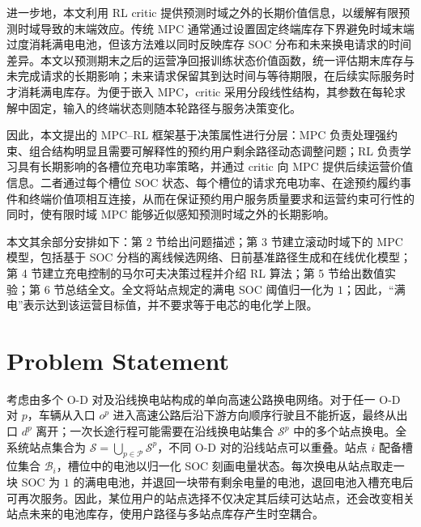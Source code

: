 \documentclass[12pt,a4paper,UTF8]{ctexart}
\begin{document}
进一步地，本文利用 RL critic 提供预测时域之外的长期价值信息，以缓解有限预测时域导致的末端效应。传统 MPC 通常通过设置固定终端库存下界避免时域末端过度消耗满电电池，但该方法难以同时反映库存 SOC 分布和未来换电请求的时间差异。本文以预测期末之后的运营净回报训练状态价值函数，统一评估期末库存与未完成请求的长期影响；未来请求保留其到达时间与等待期限，在后续实际服务时才消耗满电库存。为便于嵌入 MPC，critic 采用分段线性结构，其参数在每轮求解中固定，输入的终端状态则随本轮路径与服务决策变化。

因此，本文提出的 MPC--RL 框架基于决策属性进行分层：MPC 负责处理强约束、组合结构明显且需要可解释性的预约用户剩余路径动态调整问题；RL 负责学习具有长期影响的各槽位充电功率策略，并通过 critic 向 MPC 提供后续运营价值信息。二者通过每个槽位 SOC 状态、每个槽位的请求充电功率、在途预约履约事件和终端价值项相互连接，从而在保证预约用户服务质量要求和运营约束可行性的同时，使有限时域 MPC 能够近似感知预测时域之外的长期影响。


本文其余部分安排如下：第 2 节给出问题描述；第 3 节建立滚动时域下的 MPC 模型，包括基于 SOC 分档的离线候选网络、日前基准路径生成和在线优化模型；第 4 节建立充电控制的马尔可夫决策过程并介绍 RL 算法；第 5 节给出数值实验；第 6 节总结全文。全文将站点规定的满电 SOC 阈值归一化为 $1$；因此，“满电”表示达到该运营目标值，并不要求等于电芯的电化学上限。






\section{Problem Statement}

考虑由多个 O-D 对及沿线换电站构成的单向高速公路换电网络。对于任一 O-D 对 $p$，车辆从入口 $o^p$ 进入高速公路后沿下游方向顺序行驶且不能折返，最终从出口 $d^p$ 离开；一次长途行程可能需要在沿线换电站集合 $\mathcal S^p$ 中的多个站点换电。全系统站点集合为 $\mathcal S=\bigcup_{p\in\mathcal P}\mathcal S^p$，不同 O-D 对的沿线站点可以重叠。站点 $i$ 配备槽位集合 $\mathcal B_i$，槽位中的电池以归一化 SOC 刻画电量状态。每次换电从站点取走一块 SOC 为 $1$ 的满电电池，并退回一块带有剩余电量的电池，退回电池入槽充电后可再次服务。因此，某位用户的站点选择不仅决定其后续可达站点，还会改变相关站点未来的电池库存，使用户路径与多站点库存产生时空耦合。
\end{document}
